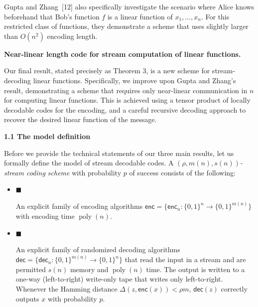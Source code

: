 \documentclass[10pt,a4paper]{article}
\begin{document}
Gupta and Zhang [12] also specifically investigate the scenario where Alice knows beforehand that Bob’s function $f$ is a linear function of $x_{1},\dots,x_{n}$.
For this restricted class of functions, they demonstrate a scheme that uses slightly larger than $O(n^{2})$ encoding length.\par





\par\medskip\noindent\textbf{Near-linear length code for stream computation of linear functions.}\par




Our final result, stated precisely as Theorem 3, is a new scheme for stream-decoding linear functions. Specifically, we improve upon Gupta and Zhang’s result, demonstrating a scheme that requires only near-linear communication in $n$ for computing linear functions. This is achieved using a tensor product of locally decodable codes for the encoding, and a careful recursive decoding approach to recover the desired linear function of the message.\par





\par\medskip\noindent\textbf{
1.1 The model definition}\par




Before we provide the technical statements of our three main results, let us formally define the model of stream decodable codes. A \emph{$(\rho,m(n),s(n))$-stream coding scheme} with probability $p$ of success consists of the following:\par


\begin{itemize}


\item[] 
$\blacksquare$ 


An explicit family of encoding algorithms $\mathsf{enc}=\{\mathsf{enc}_{n}:\{0,1\}^{n}\rightarrow\{0,1\}^{m(n)}\}$ with encoding time $\operatorname{poly}(n)$.\par





\item[] 
$\blacksquare$ 


An explicit family of randomized decoding algorithms $\mathsf{dec}=\{\mathsf{dec}_{n}:\{0,1\}^{m(n)}\rightarrow\{0,1\}^{n}\}$ that read the input in a stream and are permitted $s(n)$ memory and $\operatorname{poly}(n)$ time. The output is written to a one-way (left-to-right) write-only tape that writes only left-to-right. Whenever the Hamming distance $\Delta(z,\mathsf{enc}(x))<\rho m$, $\mathsf{dec}(z)$ correctly outputs $x$ with probability $p$.\par





\end{itemize}
\end{document}
